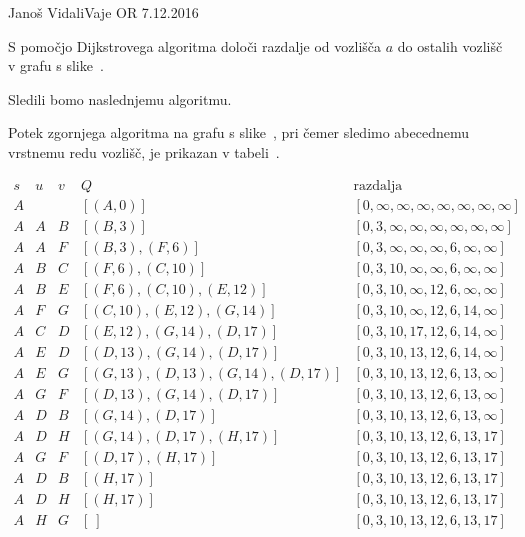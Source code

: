 \begin{naloga}{Janoš Vidali}{Vaje OR 7.12.2016}
\begin{vprasanje}
S pomočjo Dijkstrovega algoritma
določi razdalje od vozlišča $a$ do ostalih vozlišč
v grafu s slike~\fig.

\begin{slika}
\pgfslika
{}
\end{slika}
\end{vprasanje}


\begin{odgovor}
Sledili bomo naslednjemu algoritmu.

Potek zgornjega algoritma na grafu s slike~\fig,
pri čemer sledimo abecednemu vrstnemu redu vozlišč,
je prikazan v tabeli~\tab.


\begin{tabela}
$$
\begin{array}{c|c|c|c|c}
s & u & v & Q & \text{razdalja} \\ \hline
A &   &   & [(A,0)]  & [0, \infty, \infty, \infty, \infty, \infty, \infty, \infty] \\
A & A  &  B & [(B, 3)]  & [0, 3, \infty, \infty, \infty, \infty, \infty, \infty] \\
A & A  &  F & [(B, 3), (F, 6)]  & [0, 3, \infty, \infty, \infty, 6, \infty, \infty] \\
A & B  & C & [(F, 6), (C, 10)]  & [0, 3, 10, \infty, \infty, 6, \infty, \infty] \\
A & B  & E & [(F, 6), (C, 10), (E, 12)]  & [0, 3, 10, \infty, 12, 6, \infty, \infty] \\
A & F  & G & [(C, 10), (E, 12), (G, 14)]  & [0, 3, 10, \infty, 12, 6, 14, \infty] \\
A & C  & D & [(E, 12), (G, 14), (D, 17)]  & [0, 3, 10, 17, 12, 6, 14, \infty] \\
A & E  & D & [(D, 13), (G, 14), (D, 17)]  & [0, 3, 10, 13, 12, 6, 14, \infty] \\
A & E  & G & [(G, 13), (D, 13), (G, 14), (D, 17)]  & [0, 3, 10, 13, 12, 6, 13, \infty] \\
A & G  & F & [(D, 13), (G, 14), (D, 17)]  & [0, 3, 10, 13, 12, 6, 13, \infty] \\
A & D  & B & [(G, 14), (D, 17)]  & [0, 3, 10, 13, 12, 6, 13, \infty] \\
A & D  & H & [(G, 14), (D, 17), (H, 17)]  & [0, 3, 10, 13, 12, 6, 13, 17] \\
A & G  & F & [(D, 17), (H, 17)]  & [0, 3, 10, 13, 12, 6, 13, 17] \\
A & D & B & [(H, 17)]  & [0, 3, 10, 13, 12, 6, 13, 17] \\
A & D & H & [(H, 17)]  & [0, 3, 10, 13, 12, 6, 13, 17] \\
A & H & G & [\ ]  & [0, 3, 10, 13, 12, 6, 13, 17] \\

\end{array}
$$
\end{tabela}


\end{odgovor}
\end{naloga}
